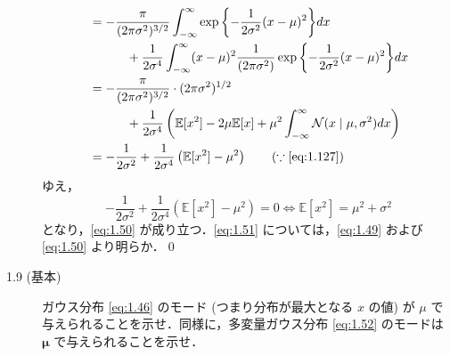 \documentclass[uplatex,a4paper,oneside,openany,dvipdfmx]{jsarticle}
\numberwithin{equation}{section}
\theoremstyle{mystyle} %
\newcommand{\BE}{\mathbb{E}}
\newcommand{\CN}{\mathcal{N}}
\newcommand{\bs}[1]{\boldsymbol{#1}}
\begin{document}
\begin{description}
\begin{align}
\begin{aligned}
        &= -\frac{\pi}{(2\pi\sigma^{2})^{3/2}} \int_{-\infty}^{\infty} \exp{\left\{-\frac{1}{2\sigma^{2}}(x-\mu)^{2}\right\}} dx \\
        &\qquad\quad + \frac{1}{2\sigma^{4}} \int_{-\infty}^{\infty} (x-\mu)^{2} \frac{1}{(2\pi\sigma^{2})} \exp{\left\{-\frac{1}{2\sigma^{2}}(x-\mu)^{2}\right\}} dx \\
        &= -\frac{\pi}{(2\pi\sigma^{2})^{3/2}} \cdot (2\pi\sigma^{2})^{1/2} \\
        &\qquad\quad + \frac{1}{2\sigma^{4}} \left(\BE[x^{2}] - 2\mu\BE[x] + \mu^{2} \int_{-\infty}^{\infty} \CN(x \mid \mu,\sigma^{2}) dx \right) \\
        &= -\frac{1}{2\sigma^{2}} + \frac{1}{2\sigma^{4}} \left(\BE[x^{2}] - \mu^{2}\right) \qquad (\because \eqref{eq:1.127})
    \end{aligned}
\end{align}
ゆえ，
\begin{equation}
    -\frac{1}{2\sigma^{2}} + \frac{1}{2\sigma^{4}} \left(\BE[x^{2}] - \mu^{2}\right) = 0 \iff \BE[x^{2}] = \mu^{2} + \sigma^{2}
\end{equation}
となり，\eqref{eq:1.50} が成り立つ．\eqref{eq:1.51} については，\eqref{eq:1.49} および \eqref{eq:1.50} より明らか．\qed

\item[1.9 (基本)]  ガウス分布 \eqref{eq:1.46} のモード (つまり分布が最大となる $x$ の値) が $\mu$ で与えられることを示せ．同様に，多変量ガウス分布 \eqref{eq:1.52} のモードは $\bs{\mu}$ で与えられることを示せ．


\end{description}
\end{document}
